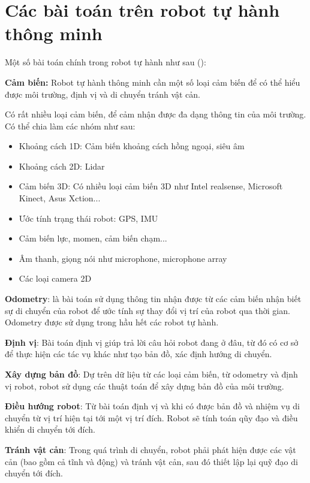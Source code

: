 \section{Các bài toán trên robot tự hành thông minh}

Một số bài toán chính trong robot tự hành như sau (\cite{Wise}):

\textbf{Cảm biến:} Robot tự hành thông minh cần một số loại cảm biến để có thể hiểu được môi trường, định vị và di chuyển tránh vật cản.

Có rất nhiều loại cảm biến, để cảm nhận được đa dạng thông tin của môi trường. Có thể chia làm các nhóm như sau:
\begin{itemize}
\item Khoảng cách 1D: Cảm biến khoảng cách hồng ngoại, siêu âm
\item Khoảng cách 2D: Lidar
\item Cảm biến 3D: Có nhiều loại cảm biến 3D như Intel realsense, Microsoft Kinect, Asus Xction...
\item Ước tính trạng thái robot: GPS, IMU
\item Cảm biến lực, momen, cảm biến chạm...
\item Âm thanh, giọng nói như microphone, microphone array
\item Các loại camera 2D
\end{itemize}

\textbf{Odometry}: là bài toán sử dụng thông tin nhận được từ các cảm biến nhận biết sự di chuyển của robot để ước tính sự thay đổi vị trí của robot qua thời gian. Odometry được sử dụng trong hầu hết các robot tự hành.

\textbf{Định vị}: Bài toán định vị giúp trả lời câu hỏi robot đang ở đâu, từ đó có cơ sở để thực hiện các tác vụ khác như tạo bản đồ, xác định hướng di chuyển.

\textbf{Xây dựng bản đồ}: Dự trên dữ liệu từ các loại cảm biến, từ odometry và định vị robot, robot sử dụng các thuật toán để xây dựng bản đồ của môi trường.

\textbf{Điều hướng robot}: Từ bài toán định vị và khi có được bản đồ và nhiệm vụ di chuyển từ vị trí hiện tại tới một vị trí đích. Robot sẽ tính toán qũy đạo và điều khiển di chuyển tới đích.

\textbf{Tránh vật cản}: Trong quá trình di chuyển, robot phải phát hiện được các vật cản (bao gồm cả tĩnh và động) và tránh vật cản, sau đó thiết lập lại quỹ đạo di chuyển tới đích.

